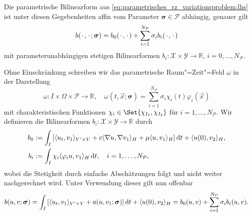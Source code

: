 \documentclass[../main.tex]{subfiles}
\begin{document}
\begin{Lemma}
\label{lemma:bilinearform_affin_parametrisch}
    Die parametrische Bilinearform aus \cref{eq:parametrisches_rz_variationsproblem:lhs} ist unter diesen Gegebenheiten affin vom Parameter $\bm \sigma \in \mathcal P$ abhängig, genauer gilt
    \begin{equation}\label{eq:bilinearform_affin_parametrisch}
        b({\mkern2mu\cdot\mkern2mu}, {\mkern2mu\cdot\mkern2mu}; \bm \sigma) = b_{0}({\mkern2mu\cdot\mkern2mu}, {\mkern2mu\cdot\mkern2mu}) + \sum_{i = 1}^{N_{\mathcal P}} \sigma_{i} b_{i}({\mkern2mu\cdot\mkern2mu}, {\mkern2mu\cdot\mkern2mu})
    \end{equation}
    mit parameterunabhängigen stetigen Bilinearformen $b_{i} \colon \mathcal X \times \mathcal Y \to \mathbb{R}$, $i = 0, \dots, N_{\mathcal P}$.

    \begin{Beweis}
        Ohne Einschränkung schreiben wir das parametrische Raum"=Zeit"=Feld $\omega$ in der Darstellung
        \begin{equation}
            \omega \colon I \times \Omega \times \mathcal P \to \mathbb{R}, \quad
            \omega(t, \vec{x}; \bm \sigma) = \sum_{i = 1}^{N_{\mathcal P}} \sigma_{i} \chi_{i}(t) \varphi_{i}(\vec x)
        \end{equation}
        mit charakteristischen Funktionen $\chi_{i} \in \Set{\chi_{I_{1}}, \chi_{I_{2}}}$ für $i = 1, \dots, N_{\mathcal P}$.
        Wir definieren die Bilinearformen $b_{i} \colon \mathcal X \times \mathcal Y \to \mathbb{R}$ durch
        \begin{equation}
            \begin{aligned}
                b_{0} &:= \int_{I} \left[ \langle u_{t},v_{1}\rangle_{V' \times V} + c\langle\nabla u,\nabla v_{1}\rangle_{H} + \mu \langle u,v_{1}\rangle_{H} \right] \mathop{}\!\mathrm{d} t + \langle u(0),v_{2}\rangle_{H},\\
                b_{i} &:= \int_{I} \chi_{i} \langle\varphi_{i}u,v_{1}\rangle_{H} \mathop{}\!\mathrm{d} t, \quad i = 1, \dots, N_{\mathcal P},
            \end{aligned}
        \end{equation}
        wobei die Stetigkeit durch einfache Abschätzungen folgt und nicht weiter nachgerechnet wird.
        Unter Verwendung dieser gilt nun offenbar
        \begin{align}
                b(u, v; \bm \sigma)
                = \int_{I} \left[ \langle u_{t},v_{1}\rangle_{V' \times V} + a(u, v_{1}; \bm \sigma) \right] \mathop{}\!\mathrm{d} t + \langle u(0),v_{2}\rangle_{H}
                = b_{0}(u, v) + \sum_{i = 1}^{N_{\mathcal P}} \sigma_{i} b_{i}(u, v).
        \end{align}
    \end{Beweis}
\end{Lemma}
\end{document}

